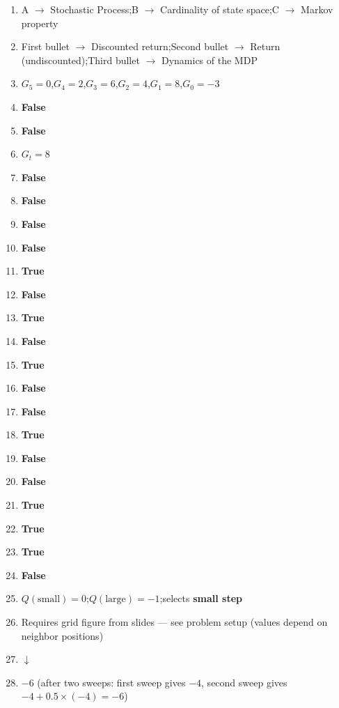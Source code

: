 \documentclass[11pt,oneside]{article}
\begin{document}
\begin{enumerate}[label=\textbf{Q\arabic*.}, leftmargin=3em, itemsep=4pt]
  \item A $\rightarrow$ Stochastic Process;\quad B $\rightarrow$ Cardinality of state space;\quad C $\rightarrow$ Markov property
  \item First bullet $\rightarrow$ Discounted return;\quad Second bullet $\rightarrow$ Return (undiscounted);\quad Third bullet $\rightarrow$ Dynamics of the MDP
  \item $G_5=0$,\quad $G_4=2$,\quad $G_3=6$,\quad $G_2=4$,\quad $G_1=8$,\quad $G_0=-3$
  \item \textbf{False}
  \item \textbf{False}
  \item $G_t = 8$

  \item \textbf{False}
  \item \textbf{False}
  \item \textbf{False}
  \item \textbf{False}
  \item \textbf{True}
  \item \textbf{False}
  \item \textbf{True}
  \item \textbf{False}
  \item \textbf{True}
  \item \textbf{False}
  \item \textbf{False}
  \item \textbf{True}
  \item \textbf{False}
  \item \textbf{False}
  \item \textbf{True}
  \item \textbf{True}
  \item \textbf{True}
  \item \textbf{False}
  \item $Q(\text{small}) = 0$;\quad $Q(\text{large}) = -1$;\quad selects \textbf{small step}
  \item Requires grid figure from slides — see problem setup (values depend on neighbor positions)
  \item $\downarrow$
  \item $-6$ (after two sweeps: first sweep gives $-4$, second sweep gives $-4 + 0.5 \times (-4) = -6$)


\end{enumerate}
\end{document}
